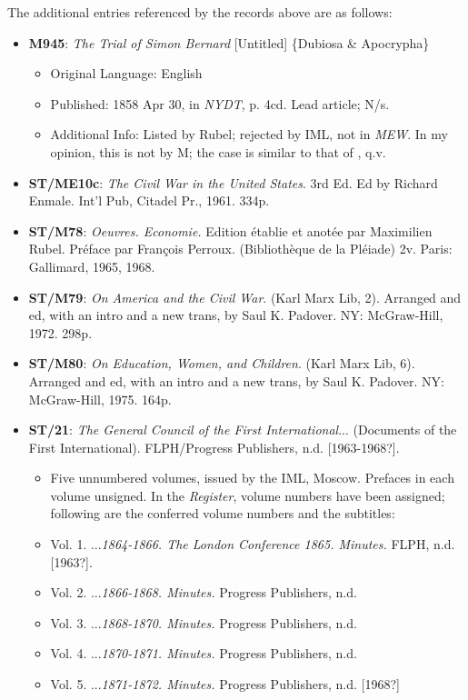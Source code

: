 The additional \register{} entries referenced by the records above are as follows:

\begin{itemize}
    \item \textbf{M945}: \textit{The Trial of Simon Bernard} [Untitled] \{Dubiosa \& Apocrypha\}
    \begin{itemize}
        \item Original Language: English
        \item Published: 1858 Apr 30, in \textit{NYDT}, p. 4cd. Lead article; N/s.
        \item Additional Info: Listed by Rubel; rejected by IML, not in \textit{MEW}. In my opinion, this is not by M; the case is similar to that of , q.v.
    \end{itemize}
    \item \textbf{ST/ME10c}: \textit{The Civil War in the United States}. 3rd Ed. Ed by Richard Enmale. Int'l Pub, Citadel Pr., 1961. 334p.
    \item \textbf{ST/M78}: \textit{Oeuvres. Economie.} Edition établie et anotée par Maximilien Rubel. Préface par François Perroux. (Bibliothèque de la Pléiade) 2v. Paris: Gallimard, 1965, 1968.
    \item \textbf{ST/M79}: \textit{On America and the Civil War}. (Karl Marx Lib, 2). Arranged and ed, with an intro and a new trans, by Saul K. Padover. NY: McGraw-Hill, 1972. 298p.
    \item \textbf{ST/M80}: \textit{On Education, Women, and Children}. (Karl Marx Lib, 6). Arranged and ed, with an intro and a new trans, by Saul K. Padover. NY: McGraw-Hill, 1975. 164p.
    \item \textbf{ST/21}: \textit{The General Council of the First International}... (Documents of the First International). FLPH/Progress Publishers, n.d. [1963-1968?].
    \begin{itemize}
        \item Five unnumbered volumes, issued by the IML, Moscow. Prefaces in each volume unsigned. In the \textit{Register}, volume numbers have been assigned; following are the conferred volume numbers and the subtitles:
        \item Vol. 1. ...\textit{1864-1866. The London Conference 1865. Minutes.} FLPH, n.d. [1963?].
        \item Vol. 2. ...\textit{1866-1868. Minutes.} Progress Publishers, n.d.
        \item Vol. 3. ...\textit{1868-1870. Minutes.} Progress Publishers, n.d.
        \item Vol. 4. ...\textit{1870-1871. Minutes.} Progress Publishers, n.d.
        \item Vol. 5. ...\textit{1871-1872. Minutes.} Progress Publishers, n.d. [1968?]
    \end{itemize}
\end{itemize}

